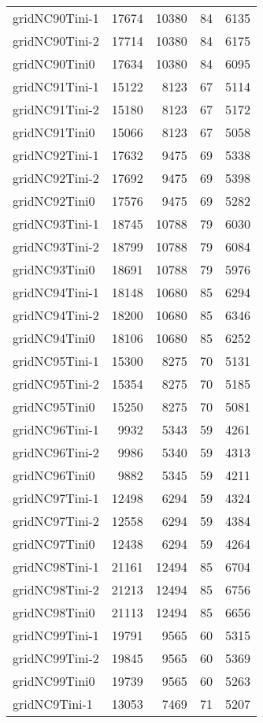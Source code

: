\begin{longtable}{lrrrr}
gridNC90Tini-1 & 17674 & 10380 & 84 & 6135 \\
gridNC90Tini-2 & 17714 & 10380 & 84 & 6175 \\
gridNC90Tini0 & 17634 & 10380 & 84 & 6095 \\
gridNC91Tini-1 & 15122 & 8123 & 67 & 5114 \\
gridNC91Tini-2 & 15180 & 8123 & 67 & 5172 \\
gridNC91Tini0 & 15066 & 8123 & 67 & 5058 \\
gridNC92Tini-1 & 17632 & 9475 & 69 & 5338 \\
gridNC92Tini-2 & 17692 & 9475 & 69 & 5398 \\
gridNC92Tini0 & 17576 & 9475 & 69 & 5282 \\
gridNC93Tini-1 & 18745 & 10788 & 79 & 6030 \\
gridNC93Tini-2 & 18799 & 10788 & 79 & 6084 \\
gridNC93Tini0 & 18691 & 10788 & 79 & 5976 \\
gridNC94Tini-1 & 18148 & 10680 & 85 & 6294 \\
gridNC94Tini-2 & 18200 & 10680 & 85 & 6346 \\
gridNC94Tini0 & 18106 & 10680 & 85 & 6252 \\
gridNC95Tini-1 & 15300 & 8275 & 70 & 5131 \\
gridNC95Tini-2 & 15354 & 8275 & 70 & 5185 \\
gridNC95Tini0 & 15250 & 8275 & 70 & 5081 \\
gridNC96Tini-1 & 9932 & 5343 & 59 & 4261 \\
gridNC96Tini-2 & 9986 & 5340 & 59 & 4313 \\
gridNC96Tini0 & 9882 & 5345 & 59 & 4211 \\
gridNC97Tini-1 & 12498 & 6294 & 59 & 4324 \\
gridNC97Tini-2 & 12558 & 6294 & 59 & 4384 \\
gridNC97Tini0 & 12438 & 6294 & 59 & 4264 \\
gridNC98Tini-1 & 21161 & 12494 & 85 & 6704 \\
gridNC98Tini-2 & 21213 & 12494 & 85 & 6756 \\
gridNC98Tini0 & 21113 & 12494 & 85 & 6656 \\
gridNC99Tini-1 & 19791 & 9565 & 60 & 5315 \\
gridNC99Tini-2 & 19845 & 9565 & 60 & 5369 \\
gridNC99Tini0 & 19739 & 9565 & 60 & 5263 \\
gridNC9Tini-1 & 13053 & 7469 & 71 & 5207 \\

\end{longtable}

